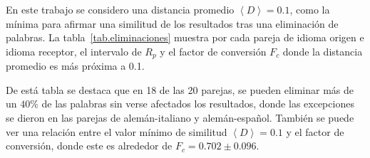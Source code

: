 En este trabajo se considero una distancia promedio $\left\langle D \right\rangle=0.1 $, como la mínima para afirmar una similitud de los resultados tras una eliminación de palabras. La tabla~\ref{tab.eliminaciones} muestra  por cada pareja de idioma origen e idioma receptor, el intervalo de $R_{p}$  y el factor de conversión $F_{c}$ donde la distancia promedio es más próxima a 0.1.

De está tabla se destaca que en 18 de las 20 parejas, se pueden eliminar más de un $40\%$ de las palabras sin verse afectados los resultados, donde las excepciones se dieron en las parejas de alemán-italiano y alemán-español.  También se puede ver una relación entre el valor mínimo de similitud  $\left\langle D \right\rangle=0.1 $ y el factor de conversión, donde este es alrededor de $F_{c}= 0.702 \pm 0.096$.







